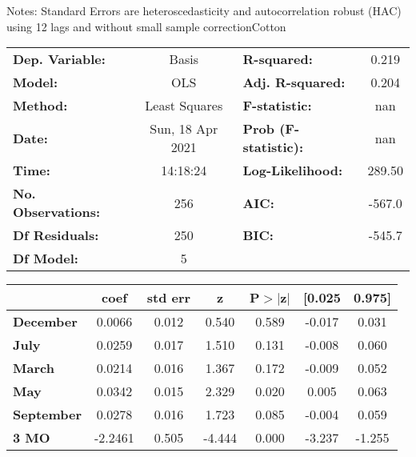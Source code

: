 Notes: \newline
 [1] Standard Errors are heteroscedasticity and autocorrelation robust (HAC) using 12 lags and without small sample correctionCotton\begin{center}
\begin{tabular}{lclc}
\toprule
\textbf{Dep. Variable:}    &      Basis       & \textbf{  R-squared:         } &     0.219   \\
\textbf{Model:}            &       OLS        & \textbf{  Adj. R-squared:    } &     0.204   \\
\textbf{Method:}           &  Least Squares   & \textbf{  F-statistic:       } &       nan   \\
\textbf{Date:}             & Sun, 18 Apr 2021 & \textbf{  Prob (F-statistic):} &      nan    \\
\textbf{Time:}             &     14:18:24     & \textbf{  Log-Likelihood:    } &    289.50   \\
\textbf{No. Observations:} &         256      & \textbf{  AIC:               } &    -567.0   \\
\textbf{Df Residuals:}     &         250      & \textbf{  BIC:               } &    -545.7   \\
\textbf{Df Model:}         &           5      & \textbf{                     } &             \\
\bottomrule
\end{tabular}
\begin{tabular}{lcccccc}
                   & \textbf{coef} & \textbf{std err} & \textbf{z} & \textbf{P$> |$z$|$} & \textbf{[0.025} & \textbf{0.975]}  \\
\midrule
\textbf{December}  &       0.0066  &        0.012     &     0.540  &         0.589        &       -0.017    &        0.031     \\
\textbf{July}      &       0.0259  &        0.017     &     1.510  &         0.131        &       -0.008    &        0.060     \\
\textbf{March}     &       0.0214  &        0.016     &     1.367  &         0.172        &       -0.009    &        0.052     \\
\textbf{May}       &       0.0342  &        0.015     &     2.329  &         0.020        &        0.005    &        0.063     \\
\textbf{September} &       0.0278  &        0.016     &     1.723  &         0.085        &       -0.004    &        0.059     \\
\textbf{3 MO}      &      -2.2461  &        0.505     &    -4.444  &         0.000        &       -3.237    &       -1.255     \\

\end{tabular}
\end{center}
